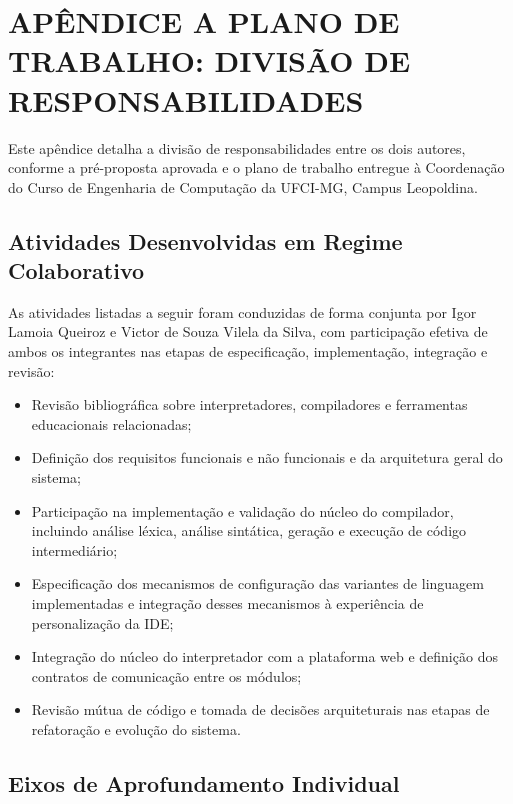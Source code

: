 
\chapter[APÊNDICE A -- PLANO DE TRABALHO: DIVISÃO DE RESPONSABILIDADES]{{\centering APÊNDICE A \textendash{} PLANO DE TRABALHO: DIVISÃO DE RESPONSABILIDADES}}  \label{ap:plano}

Este apêndice detalha a divisão de responsabilidades entre os dois autores, conforme a pré-proposta aprovada e o plano de trabalho entregue à Coordenação do Curso de Engenharia de Computação da UFCI-MG, Campus Leopoldina.

\section{Atividades Desenvolvidas em Regime Colaborativo}

As atividades listadas a seguir foram conduzidas de forma conjunta por Igor Lamoia Queiroz e Victor de Souza Vilela da Silva, com participação efetiva de ambos os integrantes nas etapas de especificação, implementação, integração e revisão:

\begin{itemize}
    \item Revisão bibliográfica sobre interpretadores, compiladores e ferramentas educacionais relacionadas;
    \item Definição dos requisitos funcionais e não funcionais e da arquitetura geral do sistema;
    \item Participação na implementação e validação do núcleo do compilador, incluindo análise léxica, análise sintática, geração e execução de código intermediário;
    \item Especificação dos mecanismos de configuração das variantes de linguagem implementadas e integração desses mecanismos à experiência de personalização da IDE;
    \item Integração do núcleo do interpretador com a plataforma web e definição dos contratos de comunicação entre os módulos;
    \item Revisão mútua de código e tomada de decisões arquiteturais nas etapas de refatoração e evolução do sistema.
\end{itemize}

\section{Eixos de Aprofundamento Individual}

